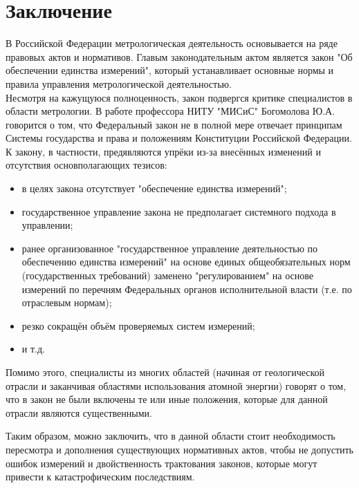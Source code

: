 \documentclass[14pt, a4paper] {ncc}
\begin{document}
\newpage
\section{Заключение}

	В Российской Федерации метрологическая деятельность основывается на ряде
	правовых актов и нормативов. Главым законодательным актом является
	закон "Об обеспечении единства измерений", который устанавливает 
	основные нормы и правила управления метрологической деятельностью.\\

	Несмотря на кажущуюся полноценность, закон подвергся критике специалистов
	в области метрологии. В работе профессора НИТУ "МИСиС" Богомолова Ю.А. \cite{bogomol}
	говорится о том, что Федеральный закон не в полной мере отвечает принципам 
	Системы государства и права и положениям Конституции Российской Федерации.
	К закону, в частности, предявляются упрёки из-за внесённых изменений
    и отсутствия основполагающих тезисов:
	\begin{itemize}
		\item в целях закона отсутствует "обеспечение единства измерений";
		\item государственное управление закона не предполагает системного подхода
		      в управлении;
		\item ранее организованное "государственное управление деятельностью по обеспечению единства измерений" на
              основе единых общеобязательных норм (государственных требований) заменено "регулированием" на
              основе измерений по перечням Федеральных органов исполнительной власти (т.е. по отраслевым нормам);
		\item резко сокращён объём проверяемых систем измерений;
		\item и т.д. 
	\end{itemize} 

	Помимо этого, специалисты из многих областей (начиная от геологической отрасли и заканчивая областями
    использования атомной энергии) говорят о том, что в закон не были включены те или иные
    положения, которые для данной отрасли являются существенными.

	Таким образом, можно заключить, что в данной области стоит необходимость пересмотра и дополнения
	существующих нормативных актов, чтобы не допустить ошибок измерений и двойственность трактования законов,
 	которые могут привести к катастрофическим последствиям.
 
\newpage

\end{document}
